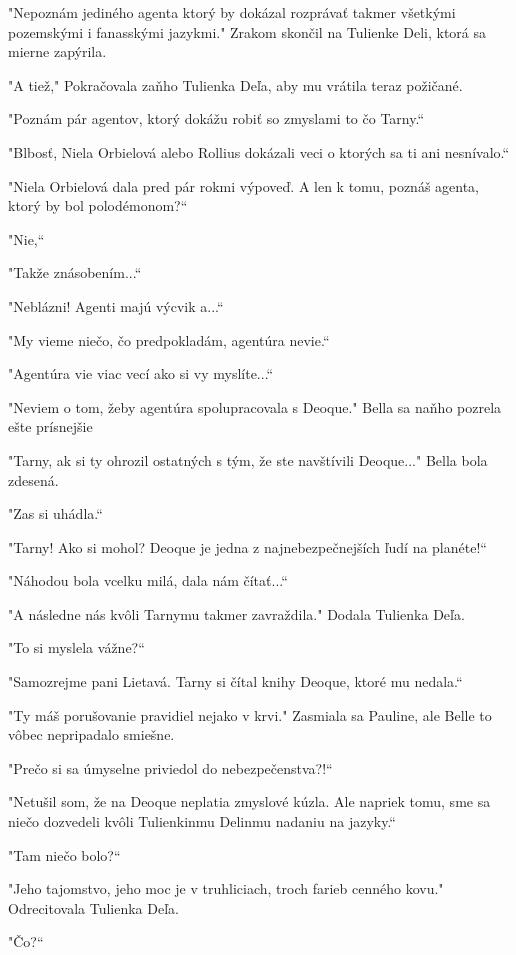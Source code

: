 \documentclass{book}
\begin{document}
"$ $Nepoznám jediného agenta ktorý by dokázal rozprávať takmer všetkými pozemskými i fanasskými jazykmi."$ $ Zrakom skončil na Tulienke Deli, ktorá sa mierne zapýrila.

"$ $A tiež,"$ $ Pokračovala zaňho Tulienka Deľa, aby mu vrátila teraz požičané.

"$ $Poznám pár agentov, ktorý dokážu robiť so zmyslami to čo Tarny.“

"$ $Blbosť, Niela Orbielová alebo Rollius dokázali veci o ktorých sa ti ani nesnívalo.“

"$ $Niela Orbielová dala pred pár rokmi výpoveď. A len k tomu, poznáš agenta, ktorý by bol polodémonom?“

"$ $Nie,“

"$ $Takže znásobením...“

"$ $Neblázni! Agenti majú výcvik a...“

"$ $My vieme niečo, čo predpokladám, agentúra nevie.“

"$ $Agentúra vie viac vecí ako si vy myslíte...“

"$ $Neviem o tom, žeby agentúra spolupracovala s Deoque."$ $ Bella sa naňho pozrela ešte prísnejšie

 "$ $Tarny, ak si ty ohrozil ostatných s tým, že ste navštívili Deoque..."$ $ Bella bola zdesená.

"$ $Zas si uhádla.“

"$ $Tarny! Ako si mohol? Deoque je jedna z najnebezpečnejších ľudí na planéte!“

"$ $Náhodou bola vcelku milá, dala nám čítať...“

"$ $A následne nás kvôli Tarnymu takmer zavraždila."$ $ Dodala Tulienka Deľa.

"$ $To si myslela vážne?“

"$ $Samozrejme pani Lietavá. Tarny si čítal knihy Deoque, ktoré mu nedala.“

"$ $Ty máš porušovanie pravidiel nejako v krvi."$ $ Zasmiala sa Pauline, ale Belle to vôbec nepripadalo smiešne.

"$ $Prečo si sa úmyselne priviedol do nebezpečenstva?!“

"$ $Netušil som, že na Deoque neplatia zmyslové kúzla. Ale napriek tomu, sme sa niečo dozvedeli kvôli Tulienkinmu Delinmu nadaniu na jazyky.“

"$ $Tam niečo bolo?“

"$ $Jeho tajomstvo, jeho moc je v truhliciach, troch farieb cenného kovu."$ $ Odrecitovala Tulienka Deľa.

"$ $Čo?“
\end{document}
